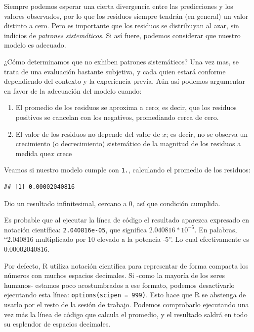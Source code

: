 \documentclass[
]{book}
\newenvironment{Shaded}{\begin{snugshade}}{\end{snugshade}}
\newcommand{\FunctionTok}[1]{\textcolor[rgb]{0.00,0.00,0.00}{#1}}
\newcommand{\NormalTok}[1]{#1}
\newcommand{\SpecialCharTok}[1]{\textcolor[rgb]{0.00,0.00,0.00}{#1}}
\providecommand{\tightlist}{%
  \setlength{\itemsep}{0pt}\setlength{\parskip}{0pt}}
\begin{document}
Siempre podemos esperar una cierta divergencia entre las predicciones y los valores observados, por lo que los residuos siempre tendrán (en general) un valor distinto a cero. Pero es importante que los residuos se distribuyan al azar, sin indicios de \emph{patrones sistemáticos}. Si así fuere, podemos considerar que nuestro modelo es adecuado.

¿Cómo determinamos que no exhiben patrones sistemáticos? Una vez mas, se trata de una evaluación bastante subjetiva, y cada quien estará conforme dependiendo del contexto y la experiencia previa. Aún así podemos argumentar en favor de la adecuación del modelo cuando:

\begin{enumerate}
\def\labelenumi{\arabic{enumi}.}
\tightlist
\item
  El promedio de los residuos se aproxima a cero; es decir, que los residuos positivos se cancelan con los negativos, promediando cerca de cero.
\item
  El valor de los residuos no depende del valor de \(x\); es decir, no se observa un crecimiento (o decrecimiento) sistemático de la magnitud de los residuos a medida que\(x\) crece
\end{enumerate}

Veamos si nuestro modelo cumple con \texttt{1.}, calculando el promedio de los residuos:

\begin{Shaded}
\end{Shaded}

\begin{verbatim}
## [1] 0.00002040816
\end{verbatim}

Dio un resultado infinitesimal, cercano a 0, así que condición cumplida.

Es probable que al ejecutar la línea de código el resultado aparezca expresado en notación científica: \texttt{2.040816e-05}, que significa \(2.040816 * 10^{-5}\). En palabras, ``2.040816 multiplicado por 10 elevado a la potencia -5''. Lo cual efectivamente es 0.00002040816.

Por defecto, R utiliza notación científica para representar de forma compacta los números con muchos espacios decimales. Si -como la mayoría de los seres humanos- estamos poco acostumbrados a ese formato, podemos desactivarlo ejecutando esta línea: \texttt{options(scipen\ =\ 999)}. Esto hace que R se abstenga de usarlo por el resto de la sesión de trabajo. Podemos comprobarlo ejecutando una vez más la línea de código que calcula el promedio, y el resultado saldrá en todo su esplendor de espacios decimales.
\end{document}
